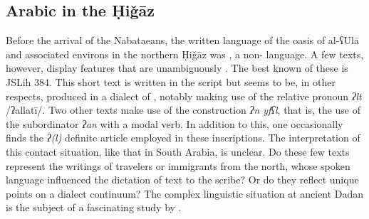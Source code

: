 \documentclass[output=paper]{langsci/langscibook}
\begin{document}
\subsection{Arabic in the Ḥiǧāz}
Before the arrival of the Nabataeans, the written language of the oasis of al-ʕUlā and associated environs in the northern Ḥiǧāz was , a non-   language. A few texts, however, display features that are unambiguously . The best known of these is JSLih 384. This short text is written in the  script but seems to be, in other respects, produced in a dialect of  , notably making use of the {relative} pronoun \textit{ʔlt} /ʔallatī/. Two other  texts make use of the  construction \textit{ʔn yfʕl}, that is, the use of the subordinator \textit{ʔan} with a {modal} verb. In addition to this, one occasionally finds the \textit{ʔ(l)} {definite} {article} employed in these inscriptions. The interpretation of this contact situation, like that in South Arabia, is unclear. Do these few texts represent the writings of travelers or immigrants from the north, whose spoken language influenced the dictation of text to the scribe? Or do they reflect unique points on a dialect continuum? The complex linguistic situation at ancient Dadan is the subject of a fascinating study by \citet{Kootstra2019}.
\end{document}
